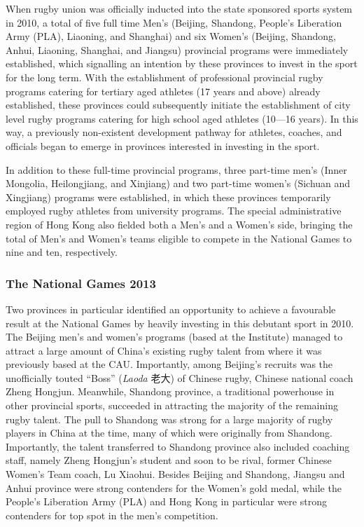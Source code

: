 \begin{CJK}{UTF8}{gbsn}
 When rugby union was officially inducted into the state sponsored sports system in 2010, a total of five full time Men's (Beijing, Shandong, People's Liberation Army (PLA), Liaoning, and Shanghai) and six Women's (Beijing, Shandong, Anhui, Liaoning, Shanghai, and Jiangsu) provincial programs were immediately established, which signalling an intention by these provinces to invest in the sport for the long term.  With the establishment of professional provincial rugby programs catering for tertiary aged athletes (17 years and above) already established, these provinces could subsequently initiate the establishment of city level rugby programs catering for high school aged athletes (10---16 years).  In this way, a previously non-existent development pathway for athletes, coaches, and officials began to emerge in provinces interested in investing in the sport.

 In addition to these full-time provincial programs, three part-time men's (Inner Mongolia, Heilongjiang, and Xinjiang) and two part-time women's (Sichuan and Xingjiang) programs were established, in which these provinces temporarily employed rugby athletes from university programs. The special administrative region of Hong Kong also fielded both a Men's and a Women's side, bringing the total of Men's and Women's teams eligible to compete in the National Games to nine and ten, respectively.

 \subsubsection{The National Games 2013\label{sect:fallFromGrace}}
 Two provinces in particular identified an opportunity to achieve a favourable result at the National Games by heavily investing in this debutant sport in 2010.  The Beijing men's and women's programs (based at the Institute) managed to attract a large amount of China's existing rugby talent from where it was previously based at the CAU.  Importantly, among Beijing's recruits was the unofficially touted ``Boss''  (\textit{Laoda} 老大) of Chinese rugby, Chinese national coach Zheng Hongjun.  Meanwhile, Shandong province, a traditional powerhouse in other provincial sports, succeeded in attracting the majority of the remaining rugby talent.  The pull to Shandong was strong for a large majority of rugby players in China at the time, many of which were originally from Shandong.  Importantly, the talent transferred to Shandong province also included coaching staff, namely Zheng Hongjun's student and soon to be rival, former Chinese Women's Team coach, Lu Xiaohui.  Besides Beijing and Shandong, Jiangsu and Anhui province were strong contenders for the Women's gold medal, while the People's Liberation Army (PLA) and Hong Kong in particular were strong contenders for top spot in the men's competition.


\end{CJK}
